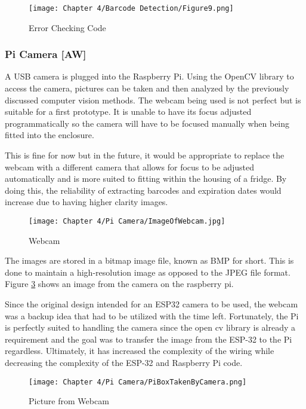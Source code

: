 \begin{figure}[H]        
    \centering
    \texttt{[image: Chapter 4/Barcode Detection/Figure9.png]}
    \caption{Error Checking Code}
    \label{fig:bc9} 
\end{figure} 

\subsubsection{Pi Camera [AW]}

A USB camera is plugged into the Raspberry Pi.
Using the OpenCV library to access the camera, pictures can be taken and then analyzed by the previously discussed computer vision methods.
The webcam being used is not perfect but is suitable for a first prototype.
It is unable to have its focus adjusted programmatically so the camera will have to be focused manually when being fitted into the enclosure.

This is fine for now but in the future, it would be appropriate to replace the webcam with a different camera that allows for focus to be adjusted automatically and is more suited to fitting within the housing of a fridge.
By doing this, the reliability of extracting barcodes and expiration dates would increase due to having higher clarity images.

\begin{figure}[H]        
    \centering
    \texttt{[image: Chapter 4/Pi Camera/ImageOfWebcam.jpg]}
    \caption{Webcam}
    \label{fig:webcam} 
\end{figure} 

The images are stored in a bitmap image file, known as BMP for short.
This is done to maintain a high-resolution image as opposed to the JPEG file format.
Figure \ref{fig:webcampic} shows an image from the camera on the raspberry pi.

Since the original design intended for an ESP32 camera to be used, the webcam was a backup idea that had to be utilized with the time left.
Fortunately, the Pi is perfectly suited to handling the camera since the open cv library is already a requirement and the goal was to transfer the image from the ESP-32 to the Pi regardless.
Ultimately, it has increased the complexity of the wiring while decreasing the complexity of the ESP-32 and Raspberry Pi code.

\begin{figure}[H]        
    \centering
    \texttt{[image: Chapter 4/Pi Camera/PiBoxTakenByCamera.png]}
    \caption{Picture from Webcam}
    \label{fig:webcampic} 
\end{figure} 

